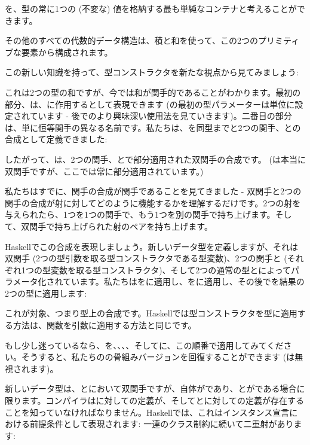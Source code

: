 
を、型の常に1つの (不変な) 値を格納する最も単純なコンテナと考えることができます。

その他のすべての代数的データ構造は、積と和を使って、この2つのプリミティブな要素から構成されます。

この新しい知識を持って、型コンストラクタを新たな視点から見てみましょう: 

これは2つの型の和ですが、今では和が関手的であることがわかります。最初の部分、は、に作用するとして表現できます (の最初の型パラメーターは単位に設定されています - 後でのより興味深い使用法を見ていきます)。二番目の部分は、単に恒等関手の異なる名前です。私たちは、を同型までと2つの関手、との合成として定義できました: 

したがって、は、2つの関手、とで部分適用された双関手の合成です。 (は本当に双関手ですが、ここでは常に部分適用されています。) 

私たちはすでに、関手の合成が関手であることを見てきました - 双関手と2つの関手の合成が射に対してどのように機能するかを理解するだけです。2つの射を与えられたら、1つを1つの関手で、もう1つを別の関手で持ち上げます。そして、双関手で持ち上げられた射のペアを持ち上げます。

Haskellでこの合成を表現しましょう。新しいデータ型を定義しますが、それは双関手 (2つの型引数を取る型コンストラクタである型変数)、2つの関手と (それぞれ1つの型変数を取る型コンストラクタ)、そして2つの通常の型とによってパラメータ化されています。私たちはをに適用し、をに適用し、その後でを結果の2つの型に適用します: 

これが対象、つまり型上の合成です。Haskellでは型コンストラクタを型に適用する方法は、関数を引数に適用する方法と同じです。

もし少し迷っているなら、を、、、、そしてに、この順番で適用してみてください。そうすると、私たちのの骨組みバージョンを回復することができます (は無視されます)。

新しいデータ型は、とにおいて双関手ですが、自体がであり、とがである場合に限ります。コンパイラはに対しての定義が、そしてとに対しての定義が存在することを知っていなければなりません。Haskellでは、これはインスタンス宣言における前提条件として表現されます: 一連のクラス制約に続いて二重射があります: 


